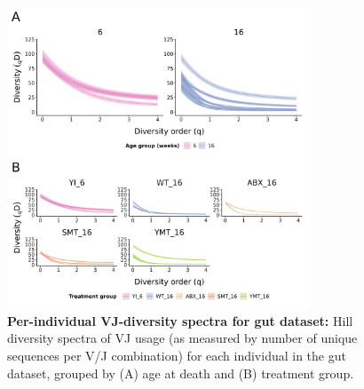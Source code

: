 \begin{figure}
\centering
\begin{subfigure}{0em}
\label{fig:igseq-gut-vj-diversity-solo-spectra-age}
\end{subfigure}
\begin{subfigure}{0em}
\label{fig:igseq-gut-vj-diversity-solo-spectra-groups}
\end{subfigure}
\includegraphics[width = 0.8\textwidth]{_Figures/png/igseq-gut-VJ-diversity-solo-spectra}
\caption[Per-individual VJ-diversity spectra for gut dataset]{\textbf{Per-individual VJ-diversity spectra for gut dataset:} Hill diversity spectra of VJ usage (as measured by number of unique sequences per V/J combination) for each individual in the \igseq gut dataset, grouped by (A) age at death and (B) treatment group.}
\label{fig:igseq-gut-vj-diversity-solo-spectra}
\end{figure}


